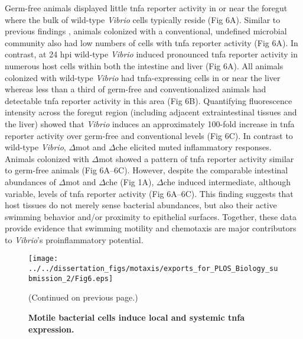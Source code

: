 {{{{{Germ-free animals displayed little tnfa reporter activity in or near the foregut where the bulk of wild-type \textit{Vibrio} cells typically reside (Fig 6A). Similar to previous findings \cite{marjoram_epigenetic_2015}, animals colonized with a conventional, undefined microbial community also had low numbers of cells with tnfa reporter activity (Fig 6A). In contrast, at 24 hpi wild-type \textit{Vibrio} induced pronounced tnfa reporter activity in numerous host cells within both the intestine and liver (Fig 6A). All animals colonized with wild-type \textit{Vibrio} had tnfa-expressing cells in or near the liver whereas less than a third of germ-free and conventionalized animals had detectable tnfa reporter activity in this area (Fig 6B). Quantifying fluorescence intensity across the foregut region (including adjacent extraintestinal tissues and the liver) showed that \textit{Vibrio} induces an approximately 100-fold increase in tnfa reporter activity over germ-free and conventional levels (Fig 6C). In contrast to wild-type \textit{Vibrio}, $\Delta$mot and $\Delta$che elicited muted inflammatory responses. Animals colonized with $\Delta$mot showed a pattern of tnfa reporter activity similar to germ-free animals (Fig 6A–6C). However, despite the comparable intestinal abundances of $\Delta$mot and $\Delta$che (Fig 1A), $\Delta$che induced intermediate, although variable, levels of tnfa reporter activity (Fig 6A–6C). This finding suggests that host tissues do not merely sense bacterial abundances, but also their active swimming behavior and/or proximity to epithelial surfaces. Together, these data provide evidence that swimming motility and chemotaxis are major contributors to \textit{Vibrio}'s proinflammatory potential. 

\begin{figure}%
	\centerline{
		\texttt{[image: ../../dissertation\_figs/motaxis/exports\_for\_PLOS\_Biology\_submission\_2/Fig6.eps]}}
	\caption{\textbf{Motile bacterial cells induce local and systemic tnfa expression.}}{(Continued on previous page.)}
	\label{fig:motaxis_fig6}
\end{figure}

}}}}}
